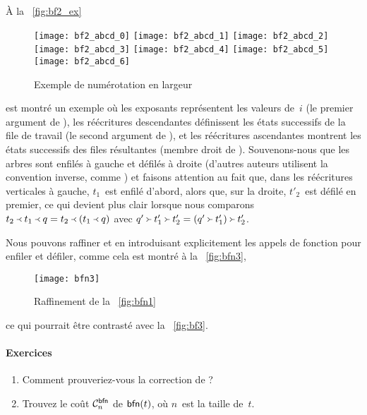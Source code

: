 À la \fig~\vref{fig:bf2_ex}
\begin{figure}[t]
\centering
\texttt{[image: bf2\_abcd\_0]}
\texttt{[image: bf2\_abcd\_1]}
\texttt{[image: bf2\_abcd\_2]}
\texttt{[image: bf2\_abcd\_3]}
\texttt{[image: bf2\_abcd\_4]}
\texttt{[image: bf2\_abcd\_5]}
\texttt{[image: bf2\_abcd\_6]}
\caption{Exemple de numérotation en largeur\label{fig:bf2_ex}}
\end{figure}
est montré un exemple où les exposants représentent les valeurs
de~\(i\) (le premier argument de
), les réécritures
descendantes définissent les états successifs de la file de travail
(le second argument de ),
et les réécritures ascendantes montrent les états successifs des files
résultantes (membre droit de
). Souvenons-nous que les
arbres sont enfilés à gauche et défilés à droite (d'autres auteurs
utilisent la convention inverse, comme \cite{Okasaki_2000}) et faisons
attention au fait que, dans les réécritures verticales à gauche,
\(t_1\)~est enfilé d'abord, alors que, sur la droite, \(t'_2\)~est
défilé en premier, ce qui devient plus clair lorsque nous comparons
\(\enq{t_2}{\enq{t_1}{q}} =
\enq{t_2}{(\enq{t_1}{q})}\) avec
\(\deq{t'_2}{\deq{t'_1}{q'}} =
\deq{t'_2}{(\deq{t'_1}{q'})}\).

Nous pouvons raffiner 
et  en introduisant
explicitement les appels de fonction pour enfiler et défiler, comme
cela est montré à la \fig~\vref{fig:bfn3},
\begin{figure}[!t]
\centering
\texttt{[image: bfn3]}
\caption{Raffinement de la \fig~\vref{fig:bfn1}\label{fig:bfn3}}
\end{figure}
ce qui pourrait être contrasté avec la \fig~\vref{fig:bf3}.

\paragraph{Exercices}
\begin{enumerate}

  \item Comment prouveriez-vous la correction de
  ?

\medskip

  \item Trouvez le coût \(\C{\fun{bfn}}{n}\) de \(\fun{bfn}(t)\), où
  \(n\)~est la taille
  de~\(t\).

\end{enumerate}

